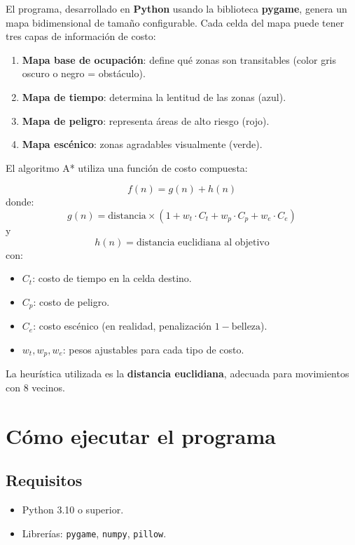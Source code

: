 \documentclass[12pt,a4paper]{article}
\begin{document}
El programa, desarrollado en \textbf{Python} usando la biblioteca \textbf{pygame}, genera un mapa bidimensional de tamaño configurable.  
Cada celda del mapa puede tener tres capas de información de costo:
\begin{enumerate}
    \item \textbf{Mapa base de ocupación}: define qué zonas son transitables (color gris oscuro o negro = obstáculo).
    \item \textbf{Mapa de tiempo}: determina la lentitud de las zonas (azul).
    \item \textbf{Mapa de peligro}: representa áreas de alto riesgo (rojo).
    \item \textbf{Mapa escénico}: zonas agradables visualmente (verde).
\end{enumerate}

El algoritmo A* utiliza una función de costo compuesta:

\[
f(n) = g(n) + h(n)
\]
donde:
\[
g(n) = \text{distancia} \times (1 + w_t \cdot C_t + w_p \cdot C_p + w_e \cdot C_e)
\]
y
\[
h(n) = \text{distancia euclidiana al objetivo}
\]
con:
\begin{itemize}
    \item \( C_t \): costo de tiempo en la celda destino.
    \item \( C_p \): costo de peligro.
    \item \( C_e \): costo escénico (en realidad, penalización \(1 - \text{belleza}\)).
    \item \( w_t, w_p, w_e \): pesos ajustables para cada tipo de costo.
\end{itemize}

La heurística utilizada es la \textbf{distancia euclidiana}, adecuada para movimientos con 8 vecinos.

\section{Cómo ejecutar el programa}

\subsection{Requisitos}
\begin{itemize}
    \item Python 3.10 o superior.
    \item Librerías: \texttt{pygame}, \texttt{numpy}, \texttt{pillow}.
\end{itemize}
\end{document}
